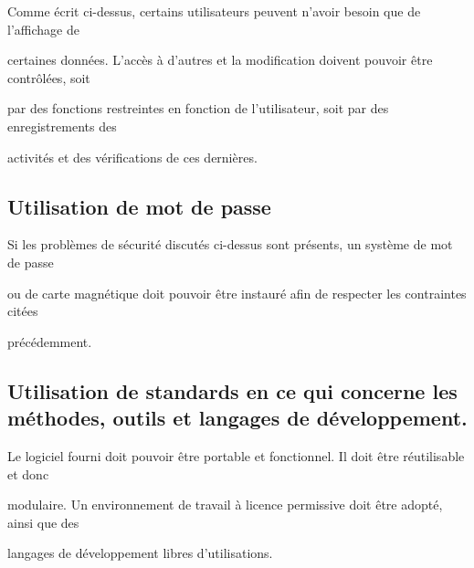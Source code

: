 \documentclass[a4paper,10pt]{article}
\begin{document}
Comme écrit ci-dessus, certains utilisateurs peuvent n’avoir besoin que de l’affichage de 

certaines données. L’accès à d’autres et la modification doivent pouvoir être contrôlées, soit 

par des fonctions restreintes en fonction de l’utilisateur, soit par des enregistrements des 

activités et des vérifications de ces dernières.

\subsection{Utilisation de mot de passe}

Si les problèmes de sécurité discutés ci-dessus sont présents, un système de mot de passe 

ou de carte magnétique doit pouvoir être instauré afin de respecter les contraintes citées 

précédemment.

\subsection{Utilisation de standards en ce qui concerne les méthodes, outils et langages de développement.}

Le logiciel fourni doit pouvoir être portable et fonctionnel. Il doit être réutilisable et donc 

modulaire. Un environnement de travail à licence permissive doit être adopté, ainsi que des 

langages de développement libres d’utilisations.
\end{document}
